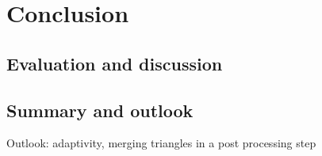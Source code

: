\chapter{Conclusion}
\label{ch:conclusion}

\section{Evaluation and discussion}
\label{sec:evaluation}


\section{Summary and outlook}
\label{sec:summary_outlook}


Outlook:
adaptivity, merging triangles in a post processing step
